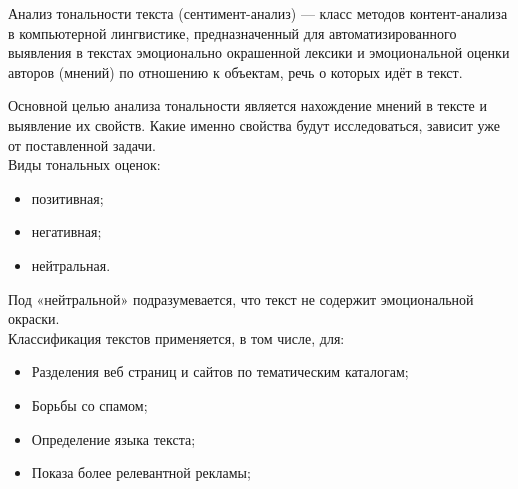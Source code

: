 \documentclass[a4paper,12pt]{report}
\begin{document}
Анализ тональности текста (сентимент-анализ) — класс методов контент-анализа в компьютерной лингвистике, предназначенный для автоматизированного выявления в текстах эмоционально окрашенной лексики и эмоциональной оценки авторов (мнений) по отношению к объектам, речь о которых идёт в текст.

Основной целью анализа тональности является нахождение мнений в тексте и выявление их свойств. Какие именно свойства будут исследоваться, зависит уже от поставленной задачи.\\
Виды тональных оценок:
\begin{itemize}
\item позитивная;
\item негативная;
\item нейтральная.
\end{itemize}
\hspace{0.6cm}Под «нейтральной» подразумевается, что текст не содержит эмоциональной окраски. \\
Классификация текстов применяется, в том числе, для:
\begin{itemize}
\item Разделения веб страниц и сайтов по тематическим каталогам;
\item Борьбы со спамом;
\item Определение языка текста;
\item Показа более релевантной рекламы;
\end{itemize}
\end{document}
